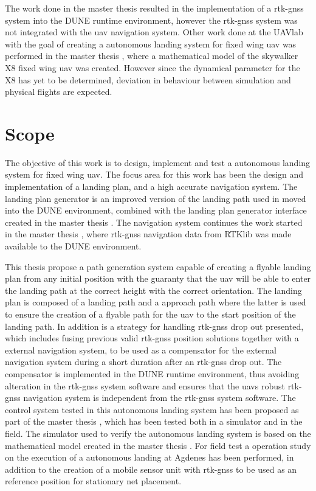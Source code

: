 The work done in the master thesis \citep{Spockeli} resulted in the implementation of a \gls{rtk-gnss} system into the DUNE runtime environment, however the \gls{rtk-gnss} system was not integrated with the \gls{uav} navigation system. Other work done at the UAVlab with the goal of creating a autonomous landing system for fixed wing \gls{uav} was performed in the master thesis \citep{Gryte}, where a mathematical model of the skywalker X8 fixed wing \gls{uav} was created. However since the dynamical parameter for the X8 has yet to be determined, deviation in behaviour between simulation and physical flights are expected.
\section{Scope}
The objective of this work is to design, implement and test a autonomous landing system for fixed wing \gls{uav}. The focus area for this work has been the design and implementation of a landing plan, and a high accurate navigation system. The landing plan generator is an improved version of the landing path used in \citep{Skulstad&Syversen} moved into the DUNE environment, combined with the landing plan generator interface created in the master thesis \citep{Froelich}. The navigation system continues the work started in the master thesis \citep{Spockeli}, where \gls{rtk-gnss} navigation data from RTKlib was made available to the DUNE environment.

This thesis propose a path generation system capable of creating a flyable landing plan from any initial position with the guaranty that the \gls{uav} will be able to enter the landing path at the correct height with the correct orientation. The landing plan is composed of a landing path and a approach path where the latter is used to ensure the creation of a flyable path for the \gls{uav} to the start position of the landing path. In addition is a strategy for handling \gls{rtk-gnss} drop out presented, which includes fusing previous valid \gls{rtk-gnss} position solutions together with a external navigation system, to be used as a compensator for the external navigation system during a short duration after an \gls{rtk-gnss} drop out. The compensator is implemented in the DUNE runtime environment, thus avoiding alteration in the \gls{rtk-gnss} system software and ensures that the \gls{uav}s robust \gls{rtk-gnss} navigation system is independent from the \gls{rtk-gnss} system software. The control system tested in this autonomous landing system has been proposed as part of the master thesis \citep{Sigurd}, which has been tested both in a simulator and in the field. The simulator used to verify the autonomous landing system is based on the mathematical model created in the master thesis \citep{Gryte}. For field test a operation study on the execution of a autonomous landing at Agdenes has been performed, in addition to the creation of a mobile sensor unit with \gls{rtk-gnss} to be used as an reference position for stationary net placement.
